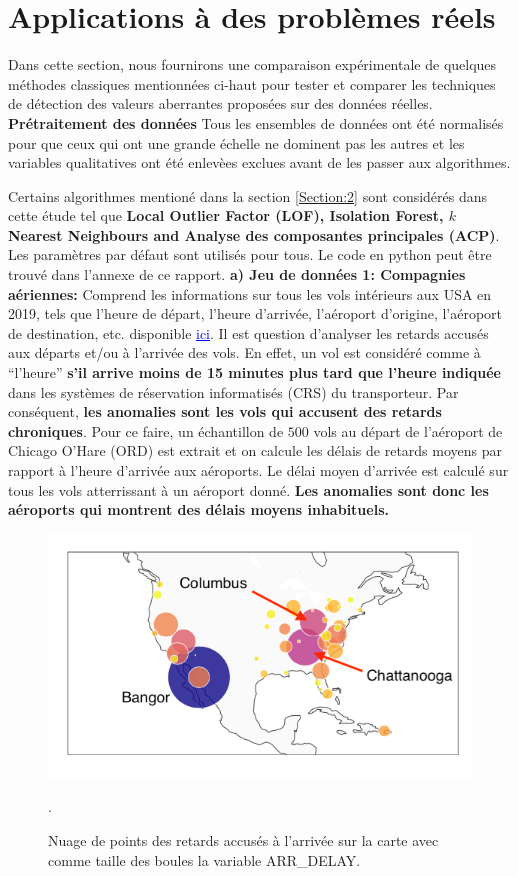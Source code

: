 
\section{Applications à des problèmes réels}\label{Section:6}

Dans cette section, nous fournirons une comparaison expérimentale de quelques méthodes classiques  mentionnées ci-haut  pour tester et comparer les techniques de détection des valeurs aberrantes proposées sur des données réelles.
\noindent\textbf{Prétraitement des données} Tous les ensembles de données ont été normalisés pour que ceux qui ont une grande échelle ne dominent pas les autres et les variables qualitatives ont été enlevèes exclues avant de les passer aux algorithmes.

\noindent Certains algorithmes mentioné dans la section \ref{Section:2} sont considérés dans cette étude tel que \textbf{Local Outlier Factor (LOF), Isolation Forest, $k$ Nearest Neighbours and Analyse des composantes principales (ACP)}. Les paramètres par défaut sont utilisés pour tous. Le code en python peut être trouvé dans l'annexe de ce rapport. \newl
\noindent \textbf{a) Jeu de données 1: Compagnies aériennes:} Comprend les informations sur tous les vols intérieurs aux USA  en 2019, tels que l'heure de départ, l'heure d'arrivée, l'aéroport d'origine, l'aéroport de destination, etc. disponible  \href{https://www.transtats.bts.gov/DL_SelectFields.asp?Table_ID=}{\textcolor{blue}{\underline{ici}}}. Il est question d’analyser les retards accusés aux  départs et/ou à l’arrivée des vols. En effet, un vol est considéré comme à “l’heure”  \textbf{s’il arrive moins de 15 minutes plus tard que l'heure indiquée} dans les systèmes de réservation informatisés (CRS) du transporteur. Par conséquent, \textbf{les anomalies sont les vols qui accusent des retards chroniques}. Pour ce faire,  un échantillon de $500$ vols au départ de l’aéroport de Chicago O’Hare (ORD) est extrait et on calcule les délais de retards moyens par rapport à l'heure d'arrivée aux aéroports. Le délai moyen d’arrivée est calculé sur tous les vols atterrissant à un aéroport donné.\textbf{ Les anomalies sont donc les aéroports qui montrent des délais moyens inhabituels.}
\begin{figure}[H]
    \centering
    \includegraphics[width=.50\textwidth]{ADOA/Images/vols1.png}
    \caption{Nuage de points des retards accusés à l'arrivée sur la carte avec comme taille des boules la variable ARR\_DELAY.}%
    \label{fig20}.
\end{figure}
